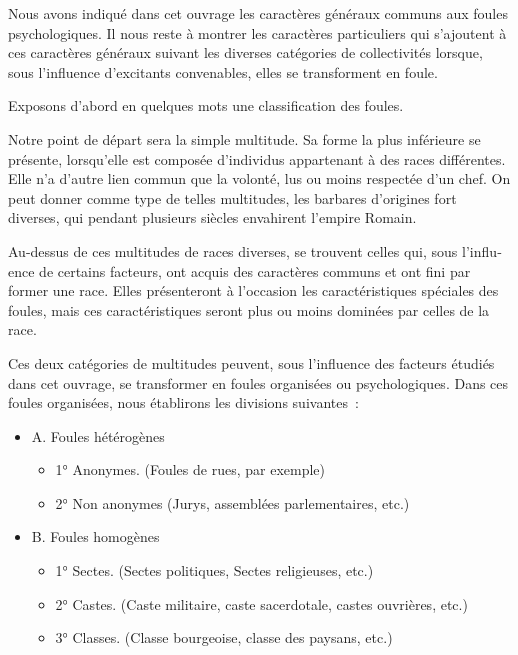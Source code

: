 \documentclass[french,twoside]{book} %
\begin{document}
\noindent Nous avons indiqué dans cet ouvrage les caractères généraux communs aux foules psychologiques. Il nous reste à montrer les caractères particuliers qui s’ajoutent à ces caractères généraux suivant les diverses catégories de collectivités lorsque, sous l’influence d’excitants convenables, elles se transforment en foule.\par
Exposons d’abord en quelques mots une classification des foules.\par
Notre point de départ sera la simple multitude. Sa forme la plus inférieure se présente, lorsqu’elle est composée d’individus appartenant à des races différentes. Elle n’a d’autre lien commun que la volonté, lus ou moins respectée d’un chef. On peut donner comme type de telles multitudes, les barbares d’origines fort diverses, qui pen­dant plusieurs siècles envahirent l’empire Romain.\par
Au-dessus de ces multitudes de races diverses, se trouvent celles qui, sous l’influ­ence de certains facteurs, ont acquis des caractères communs et ont fini par former une race. Elles présenteront à l’occasion les caractéristiques spéciales des foules, mais ces caractéristiques seront plus ou moins dominées par celles de la race.\par
Ces deux catégories de multitudes peuvent, sous l’influence des facteurs étudiés dans cet ouvrage, se transformer en foules organisées ou psychologiques. Dans ces foules organisées, nous établirons les divisions suivantes :\par

\begin{itemize}[itemsep=\baselineskip,]
\item A. Foules hétérogènes 
\begin{itemize}[itemsep=0pt,]
\item 1° Anonymes. (Foules de rues, par exemple)
\item 2° Non anonymes (Jurys, assemblées parlementaires, etc.)
\end{itemize}

 
\item B. Foules homogènes 
\begin{itemize}[itemsep=0pt,]
\item 1° Sectes. (Sectes politiques, Sectes religieuses, etc.)
\item 2° Castes. (Caste militaire, caste sacerdotale, castes ouvrières, etc.)
\item 3° Classes. (Classe bourgeoise, classe des paysans, etc.)
\end{itemize}

 
\end{itemize}
\end{document}
